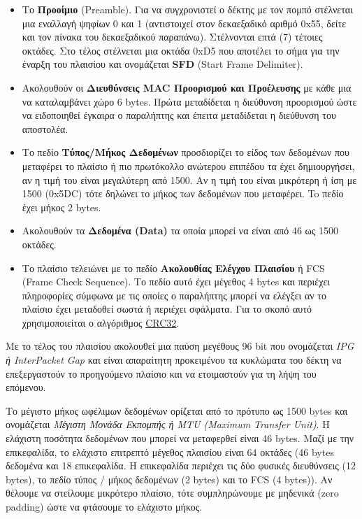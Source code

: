 \begin{itemize}
\item Το \textbf{Προοίμιο} (Preamble). Για να συγχρονιστεί ο δέκτης με τον πομπό στέλνεται μια εναλλαγή ψηφίων 0 και 1 (αντιστοιχεί στον δεκαεξαδικό αριθμό 0x55, δείτε και τον πίνακα του δεκαεξαδικού παραπάνω). Στέλνονται επτά (7) τέτοιες οκτάδες. Στο τέλος στέλνεται μια οκτάδα 0xD5 που αποτέλει το σήμα για την έναρξη του πλαισίου και ονομάζεται \textbf{SFD} (Start Frame Delimiter). 
\item Ακολουθούν οι \textbf{Διευθύνσεις MAC Προορισμού και Προέλευσης} με κάθε μια να καταλαμβάνει χώρο 6 bytes.  Πρώτα μεταδίδεται η διεύθυνση προορισμού ώστε να ειδοποιηθεί έγκαιρα ο παραλήπτης και έπειτα μεταδίδεται η διεύθυνση του αποστολέα. 
\item Το πεδίο \textbf{Τύπος/Μήκος Δεδομένων} προσδιορίζει το είδος των δεδομένων που μεταφέρει το πλαίσιο ή πιο πρωτόκολλο ανώτερου επιπέδου τα έχει δημιουργήσει, αν η τιμή του είναι μεγαλύτερη από 1500. Αν η τιμή του είναι μικρότερη ή ίση με 1500 (0x5DC) τότε δηλώνει το μήκος των δεδομένων που μεταφέρει. To πεδίο έχει μήκος 2 bytes.
\item Ακολουθούν τα \textbf{Δεδομένα (Data)} τα οποία μπορεί να είναι από 46 ως 1500 οκτάδες.
\item Το πλαίσιο τελειώνει με το πεδίο \textbf{Ακολουθίας Ελέγχου Πλαισίου} ή FCS (Frame Check Sequence). Το πεδίο αυτό έχει μέγεθος 4 bytes και περιέχει πληροφορίες σύμφωνα με τις οποίες ο παραλήπτης μπορεί να ελέγξει αν το πλαίσιο έχει μεταδοθεί σωστά ή περιέχει σφάλματα. Για το σκοπό αυτό χρησιμοποιείται ο  αλγόριθμος \href{https://en.wikipedia.org/wiki/Cyclic_redundancy_check}{CRC32}.
\end{itemize}

Με το τέλος του πλαισίου ακολουθεί μια παύση μεγέθους 96 bit που ονομάζεται \emph{IPG ή InterPacket Gap} και είναι απαραίτητη προκειμένου τα κυκλώματα του δέκτη να επεξεργαστούν το προηγούμενο πλαίσιο και να ετοιμαστούν για τη λήψη του επόμενου.

Το μέγιστο μήκος ωφέλιμων δεδομένων ορίζεται από το πρότυπο ως 1500 bytes και ονομάζεται \emph{Μέγιστη Μονάδα Εκπομπής ή MTU (Maximum Transfer Unit)}. Η ελάχιστη ποσότητα δεδομένων που μπορεί να μεταφερθεί είναι 46 bytes. Μαζί με την επικεφαλίδα, το ελάχιστο επιτρεπτό μέγεθος πλαισίου είναι 64 οκτάδες (46 bytes δεδομένα και 18 επικεφαλίδα. Η επικεφαλίδα περιέχει τις δύο φυσικές διευθύνσεις (12 bytes), το πεδίο τύπος / μήκος δεδομένων (2 bytes) και το FCS (4 bytes)). Αν θέλουμε να στείλουμε μικρότερο πλαίσιο, τότε συμπληρώνουμε με μηδενικά (zero padding) ώστε να φτάσουμε το ελάχιστο μήκος.